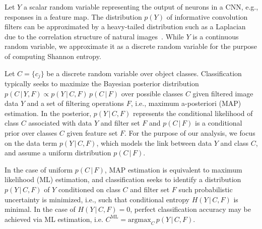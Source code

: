 \documentclass[10pt,onecolumn]{article}
\begin{document}
Let $Y$ a scalar random variable representing the output of neurons in a CNN, e.g., responses in a feature map. The distribution $p(Y)$ of informative convolution filters can be approximated by a heavy-tailed distribution such as a Laplacian due to the correlation structure of natural images~\cite{simoncelli2001natural,simon2007scene}. While $Y$ is a continuous random variable, we approximate it as a discrete random variable for the purpose of computing Shannon entropy. %

Let $C = \{c_j\}$ be a discrete random variable over object classes. Classification typically seeks to maximize the Bayesian posterior distribution $p(C\, | \,Y,F) \propto p(Y\, | \,C,F)\, p(C\, | \,F)$ over possible classes $C$ given filtered image data $Y$ and a set of filtering operations $F$, i.e., maximum a-posteriori (MAP) estimation. In the posterior, $p(Y\, | \,C,F)$ represents the conditional likelihood of class $C$ associated with data $Y$ and filter set $F$ and $p(C\, | \,F)$ is a conditional prior over classes $C$ given feature set $F$. For the purpose of our analysis, we focus on the data term $p(Y\, | \,C,F)$, which models the link between data $Y$ and class $C$, and assume a uniform distribution $p(C\, | \,F)$.

In the case of uniform $p(C\, | \,F)$, MAP estimation is equivalent to maximum likelihood (ML) estimation, and classification seeks to identify a distribution $p(Y\, | \,C,F)$ of $Y$ conditioned on class $C$ and filter set $F$ such probabilistic uncertainty is minimized, i.e., such that conditional entropy $H(Y\, | \,C,F)$ is minimal. In the case of $H(Y\, | \,C,F) = 0$, perfect classification accuracy may be achieved via ML estimation, i.e. $C^\mathrm{ML} = \textrm{argmax}_C \, p(Y\, | \,C, F)$. %
\end{document}
